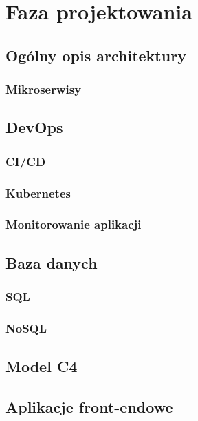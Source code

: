 \section{Faza projektowania}

\subsection{Ogólny opis architektury}

\subsubsection{Mikroserwisy}

\subsection{DevOps}

\subsubsection{CI/CD}

\subsubsection{Kubernetes}

\subsubsection{Monitorowanie aplikacji}

\subsection{Baza danych}

\subsubsection{SQL}

\subsubsection{NoSQL}

\subsection{Model C4}

\subsection{Aplikacje front-endowe}

